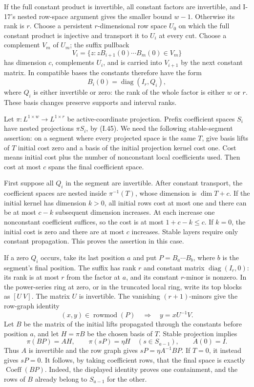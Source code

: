 If the full constant product is invertible, all constant
factors are invertible, and I-17's nested row-space argument
gives the smaller bound $w-1$.  Otherwise its rank is $r$.
Choose a persistent $r$-dimensional row space $U_0$ on which
the full constant product is injective and transport it to
$U_i$ at every cut.  Choose a complement $V_m$ of $U_m$;
the suffix pullback
\[
 V_i=\{z:zB_{i+1}(0)\cdots B_m(0)\in V_m\}
\]
has dimension $c$, complements $U_i$, and is carried into
$V_{i+1}$ by the next constant matrix.  In compatible bases
the constants therefore have the form
\[
 B_i(0)=\operatorname{diag}(I_r,Q_i),
 \tag{I.45}
\]
where $Q_i$ is either invertible or zero: the rank of the
whole factor is either $w$ or $r$.  These basis changes
preserve supports and interval ranks.

Let $\pi:L^{1\times w}\to L^{1\times r}$ be active-coordinate
projection.  Prefix coefficient spaces $S_i$ have nested
projections $\pi S_i$, by (I.45).
We need the following stable-segment assertion: on a segment
where every projected space is the same $T$, give basis lifts
of $T$ initial cost zero and a basis of the initial projection
kernel cost one.  Cost means initial cost plus the number of
nonconstant local coefficients used.  Then cost at most $c$
spans the final coefficient space.

First suppose all $Q_i$ in the segment are invertible.
After constant transport, the coefficient spaces are nested
inside $\pi^{-1}(T)$, whose dimension is $\dim T+c$.
If the initial kernel has dimension $k>0$, all initial rows
cost at most one and there can be at most $c-k$ subsequent
dimension increases.  At each increase one nonconstant
coefficient suffices, so the cost is at most
$1+c-k\le c$.  If $k=0$, the initial cost is zero and
there are at most $c$ increases.  Stable layers require only
constant propagation.  This proves the assertion in this case.

If a zero $Q_i$ occurs, take its last position $a$ and put
$P=B_a\cdots B_b$, where $b$ is the segment's final position.
The suffix has rank $r$ and constant matrix
$\operatorname{diag}(I_r,0)$: its rank is at most $r$ from
the factor at $a$, and its constant $r$-minor is nonzero.
In the power-series ring at zero, or in the truncated local
ring, write its top blocks as $[U\ V]$.  The matrix $U$
is invertible.  The vanishing $(r+1)$-minors give the row-graph
identity
\[
 (x,y)\in\operatorname{rowmod}(P)
       \quad\Longrightarrow\quad y=xU^{-1}V.
\]
Let $B$ be the matrix of the initial lifts propagated through
the constants before position $a$, and let $H=\pi B$ be the
chosen basis of $T$.  Stable projection implies
\[
 \pi(BP)=AH,\qquad \pi(sP)=\eta H\quad(s\in S_{a-1}),
 \qquad A(0)=I.
\]
Thus $A$ is invertible and the row graph gives
$sP=\eta A^{-1}BP$.  If $T=0$, it instead gives $sP=0$.
It follows, by taking coefficient rows, that the final space
is exactly $\operatorname{Coeff}(BP)$.  Indeed, the displayed
identity proves one containment, and the rows of $B$ already
belong to $S_{a-1}$ for the other.

